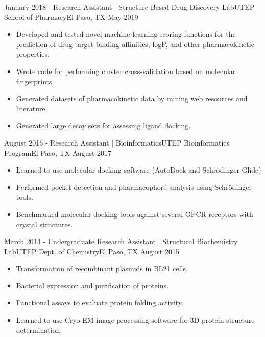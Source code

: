 \begin{experiences}
  \emptySeparator
  
  \experience
    {January 2018 -}     {Research Assistant | Structure-Based Drug Discovery Lab}{UTEP School of Pharmacy}{El Paso, TX}
    {May 2019}    {
        \begin{itemize}
        \item Developed and tested novel machine-learning scoring functions for the prediction of drug-target binding affinities, logP, and other pharmacokinetic properties.
        \item Wrote code for performing cluster cross-validation based on molecular fingerprints.
        \item Generated datasets of pharmacokinetic data by mining web resources and literature.
        \item Generated large decoy sets for assessing ligand docking.
        \end{itemize}
    }
                  
  \emptySeparator
  
  \experience
    {August 2016 -}     {Research Assistant | Bioinformatics}{UTEP Bioinformatics Program}{El Paso, TX}
    {August 2017}    {
        \begin{itemize}
        \item Learned to use molecular docking software (AutoDock and Schrödinger Glide)
        \item Performed pocket detection and pharmacophore analysis using Schrödinger tools.
        \item Benchmarked molecular docking tools against several GPCR receptors with crystal structures.
        \end{itemize}
    }
                  
  \emptySeparator
  
    \experience
    {March 2014 -}     {Undergraduate Research Assistant | Structural Biochemistry Lab}{UTEP Dept. of Chemistry}{El Paso, TX}
    {August 2015}    {
        \begin{itemize}
        \item Transformation of recombinant plasmids in BL21 cells.
        \item Bacterial expression and purification of proteins.
        \item Functional assays to evaluate protein folding activity.
        \item Learned to use Cryo-EM image processing software for 3D protein structure determination.
        \end{itemize}
    }

\end{experiences}

